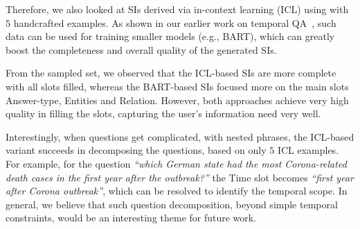 Therefore, we also looked at SIs derived via in-context learning (ICL) using \gptfour with $5$ handcrafted examples.
As shown in our earlier work on temporal QA~\cite{Jia-FAITH:WWW2024},
such data can be used for training smaller models (e.g., BART),
which can greatly boost the completeness and overall quality of the generated SIs.

From the sampled set, we observed that the ICL-based SIs are more
complete with all slots filled, whereas the BART-based SIs focused more
on the main slots Answer-type, Entities and Relation.
However, both approaches achieve very high quality in filling the slots,
capturing the user's information need very well.

Interestingly, when questions get complicated, with nested phrases, 
the ICL-based variant succeeds in decomposing the questions, based on only $5$ ICL examples.
For example, for the question {\em ``which German state had the most Corona-related death cases in the first year after the outbreak?''}
the Time slot becomes {\em ``first year after Corona outbreak''},
which can be resolved to identify the temporal scope.
In general, we believe that such question decomposition, beyond simple temporal constraints,
would be an interesting theme for future work.

